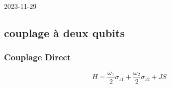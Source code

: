 


2023-11-29

\setcounter{section}{7}
\setcounter{subsection}{1}

\subsection{couplage à deux qubits}

\subsubsection{Couplage Direct}


\[ H = \frac{\omega_1}{2} \sigma_{z1} + \frac{\omega_2}{2} \sigma_{z2} + JS \]





